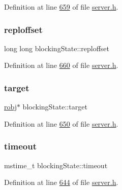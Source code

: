 Definition at line \hyperlink{server_8h_source_l00659}{659} of file \hyperlink{server_8h_source}{server.\+h}.

\mbox{\label{structblockingState_a6e19b268054c3ea039a7ecb504010870}} 
\subsubsection{\texorpdfstring{reploffset}{reploffset}}
{\footnotesize\ttfamily long long blocking\+State\+::reploffset}



Definition at line \hyperlink{server_8h_source_l00660}{660} of file \hyperlink{server_8h_source}{server.\+h}.

\mbox{\label{structblockingState_aaa1a98ecc7b021e16e9eb989be9179a0}} 
\subsubsection{\texorpdfstring{target}{target}}
{\footnotesize\ttfamily \hyperlink{structredisObject}{robj}$\ast$ blocking\+State\+::target}



Definition at line \hyperlink{server_8h_source_l00650}{650} of file \hyperlink{server_8h_source}{server.\+h}.

\mbox{\label{structblockingState_a91cba57f48dc0baa84ecea14967aa988}} 
\subsubsection{\texorpdfstring{timeout}{timeout}}
{\footnotesize\ttfamily mstime\+\_\+t blocking\+State\+::timeout}



Definition at line \hyperlink{server_8h_source_l00644}{644} of file \hyperlink{server_8h_source}{server.\+h}.

\mbox{\label{structblockingState_ab5ab9e2de89ee6cb3bb283422f9fcd40}} 
